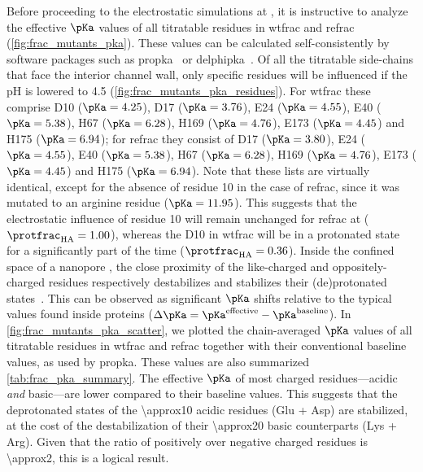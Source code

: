 Before proceeding to the electrostatic simulations at , it is instructive to analyze the
effective $\pKa$ values of all titratable residues in \gls{wtfrac} and \gls{refrac}
(\cref{fig:frac_mutants_pka}). These values can be calculated self-consistently by software packages such as
\gls{propka}~\cite{Olsson-2011,Sondergaard-2011} or \gls{delphipka}~\cite{Wang-2015}. Of all the titratable
side-chains that face the interior channel wall, only specific residues will be influenced if the pH is
lowered to \num{4.5} (\cref{fig:frac_mutants_pka_residues}). For \gls{wtfrac} these comprise D10 ($\pKa =
4.25$), D17 ($\pKa = 3.76$), E24 ($\pKa = 4.55$), E40 ($\pKa = 5.38$), H67 ($\pKa = 6.28$), H169 ($\pKa =
4.76$), E173 ($\pKa = 4.45$) and H175 ($\pKa = 6.94$); for \gls{refrac} they consist of D17 ($\pKa = 3.80$),
E24 ($\pKa = 4.55$), E40 ($\pKa = 5.38$), H67 ($\pKa = 6.28$), H169 ($\pKa = 4.76$), E173 ($\pKa = 4.45$) and
H175 ($\pKa = 6.94$). Note that these lists are virtually identical, except for the absence of residue 10 in
the case of \gls{refrac}, since it was mutated to an arginine residue ($\pKa = 11.95$). This suggests that the
electrostatic influence of residue 10 will remain unchanged for \gls{refrac} at 
($\protfrac_{\mathrm{HA}} = 1.00$), whereas the D10 in \gls{wtfrac} will be in a protonated state for a
significantly part of the time ($\protfrac_{\mathrm{HA}} = 0.36$). Inside the confined space of a nanopore
\lumen{}, the close proximity of the like-charged and oppositely-charged residues respectively destabilizes
and stabilizes their (de)protonated states~\cite{Olsson-2011}. This can be observed as significant $\pKa$
shifts relative to the typical values found inside proteins ($\Delta \pKa = \pKa^{\textrm{effective}} -
\pKa^{\textrm{baseline}}$). In \cref{fig:frac_mutants_pka_scatter}, we plotted the chain-averaged $\pKa$
values of all titratable residues in \gls{wtfrac} and \gls{refrac} together with their conventional baseline
values, as used by \gls{propka}. These values are also summarized \cref{tab:frac_pka_summary}. The effective
$\pKa$ of most charged residues---acidic \emph{and} basic---are lower compared to their baseline values. This
suggests that the deprotonated states of the \num{\approx10} acidic residues (Glu + Asp) are stabilized, at
the cost of the destabilization of their \num{\approx20} basic counterparts (Lys + Arg). Given that the ratio
of positively over negative charged residues is \num{\approx2}, this is a logical result.

